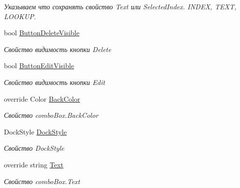 \begin{DoxyCompactItemize}
\begin{DoxyCompactList}\small\item\em Указываем что сохранять свойство Text или Selected\+Index. I\+N\+D\+EX, T\+E\+XT, L\+O\+O\+K\+UP. ~\newline
\end{DoxyCompactList}\item 
bool \mbox{\hyperlink{class_f_b_a_1_1_sys_d_b_edit_ad2c7f363da69716c7679a316e6fdc1ea}{Button\+Delete\+Visible}}
\begin{DoxyCompactList}\small\item\em Свойство видимость кнопки Delete \end{DoxyCompactList}\item 
bool \mbox{\hyperlink{class_f_b_a_1_1_sys_d_b_edit_a036bbd00b9024e2bb8684e7bfc04b32d}{Button\+Edit\+Visible}}
\begin{DoxyCompactList}\small\item\em Свойство видимость кнопки Edit \end{DoxyCompactList}\item 
override Color \mbox{\hyperlink{class_f_b_a_1_1_sys_d_b_edit_a8b79d6a473498e7558bb362204b3d3da}{Back\+Color}}
\begin{DoxyCompactList}\small\item\em Свойство combo\+Box.\+Back\+Color \end{DoxyCompactList}\item 
Dock\+Style \mbox{\hyperlink{class_f_b_a_1_1_sys_d_b_edit_adc0915832fe0d8c4d563a46585e085fa}{Dock\+Style}}
\begin{DoxyCompactList}\small\item\em Свойство Dock\+Style \end{DoxyCompactList}\item 
override string \mbox{\hyperlink{class_f_b_a_1_1_sys_d_b_edit_a5365a2a149bae1e99378b755df24951e}{Text}}
\begin{DoxyCompactList}\small\item\em Свойство combo\+Box.\+Text \end{DoxyCompactList}\item 

\end{DoxyCompactItemize}
